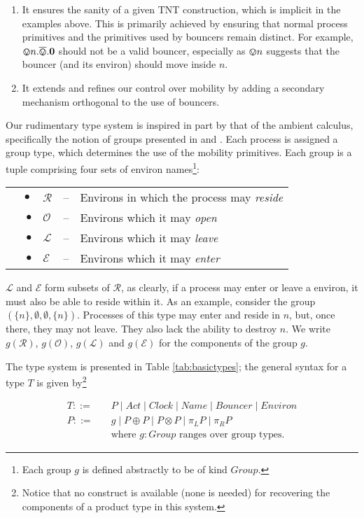 \documentclass[orivec,envcountsame]{llncs}
\begin{document}
\begin{enumerate}
\item It ensures the sanity of a given TNT construction, which is
  implicit in the examples above.  This is primarily achieved by
  ensuring that normal process primitives and the primitives used by
  bouncers remain distinct.  For example,
  $\varovee n.\overline{\varovee}.\textbf{0}$ should not be a valid bouncer,
  especially as $\varovee n$ suggests that the bouncer (and its environ)
  should move inside $n$.
\item It extends and refines our control over mobility by adding a
      secondary mechanism orthogonal to the use of bouncers.
\end{enumerate}

Our rudimentary type system is inspired in part by that of the ambient calculus,
specifically the notion of groups presented in \cite{ambienttypes} and
\cite{m3}.  Each process is assigned a group type, which determines the
use of the mobility primitives.  Each group is a tuple comprising four
sets of environ names\footnote{Each group $g$ is defined abstractly to
be of kind $Group$.}:

\begin{tabular}{rlcl}
$\quad \bullet$ & $\mathscr{R}$ & -- & Environs in which the process may
 \emph{reside} \\
$\bullet$ & $\mathscr{O}$ & -- & Environs which it may \emph{open} \\
$\bullet$ & $\mathscr{L}$ & -- & Environs which it may \emph{leave} \\
$\bullet$ & $\mathscr{E}$ & -- & Environs which it may \emph{enter}
\end{tabular}

$\mathscr{L}$ and $\mathscr{E}$ form subsets of $\mathscr{R}$, as
clearly, if a process may enter or leave a environ, it must also be able
to reside within it.  As an example, consider the group
$(\{n\},\emptyset, \emptyset,\{n\})$.  Processes of this type may enter
and reside in $n$, but, once there, they may not leave.  They also lack
the ability to destroy $n$.  We write $g(\mathscr{R})$,
$g(\mathscr{O})$, $g(\mathscr{L})$ and $g(\mathscr{E})$ for the
components of the group $g$.

The type system is presented in Table \ref{tab:basictypes}; the general
syntax for a type $T$ is given by\footnote{Notice that no construct is
available (none is needed) for recovering the components of a product
type in this system.}

\begin{equation*}\begin{aligned}
T \mathrel{::=} & \quad P \mid Act \mid Clock \mid Name \mid Bouncer \mid
 Environ \\
P \mathrel{::=} & \quad g \mid P \oplus P \mid P \otimes P \mid \pi_L P \mid
 \pi_R P \\
                & \quad \text{where $g \colon Group$ ranges over group types.}
\end{aligned}
\end{equation*}
\end{document}
